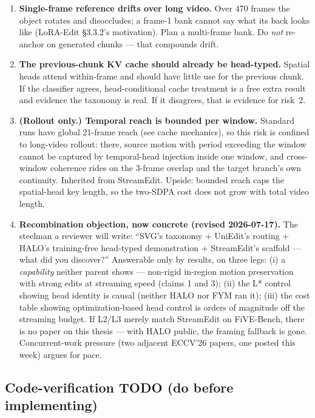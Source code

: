 \documentclass{article}
\begin{document}
\begin{enumerate}
  \item \textbf{Single-frame reference drifts over long video.} Over 470 frames
        the object rotates and disoccludes; a frame-1 bank cannot say what its
        back looks like (LoRA-Edit \S3.3.2's motivation). Plan a multi-frame
        bank. Do \emph{not} re-anchor on generated chunks --- that compounds
        drift.
  \item \textbf{The previous-chunk KV cache should already be head-typed.}
        Spatial heads attend within-frame and should have little use for the
        previous chunk. If the classifier agrees, head-conditional cache
        treatment is a free extra result and evidence the taxonomy is real. If it
        disagrees, that is evidence for risk~2.
  \item \textbf{(Rollout only.) Temporal reach is bounded per window.} Standard
        runs have global 21-frame reach (see cache mechanics), so this risk is
        confined to long-video rollout: there, source motion with period
        exceeding the window cannot be captured by temporal-head injection
        inside one window, and cross-window coherence rides on the 3-frame
        overlap and the target branch's own continuity. Inherited from
        StreamEdit. Upside: bounded reach caps the spatial-head key length, so
        the two-SDPA cost does not grow with total video length.
  \item \textbf{Recombination objection, now concrete (revised 2026-07-17).}
        The steelman a reviewer will write: ``SVG's taxonomy $+$ UniEdit's
        routing $+$ HALO's training-free head-typed demonstration $+$
        StreamEdit's scaffold --- what did you discover?'' Answerable only by
        results, on three legs: (i) a \emph{capability} neither parent shows
        --- non-rigid in-region motion preservation with strong edits at
        streaming speed (claims 1 and 3); (ii) the L* control showing head
        identity is causal (neither HALO nor FYM ran it); (iii) the cost table
        showing optimization-based head control is orders of magnitude off the
        streaming budget. If L2/L3 merely match StreamEdit on FiVE-Bench, there
        is no paper on this thesis --- with HALO public, the framing fallback
        is gone. Concurrent-work pressure (two adjacent ECCV'26 papers, one
        posted this week) argues for pace.
\end{enumerate}

\subsection*{Code-verification TODO (do before implementing)}
\end{document}
